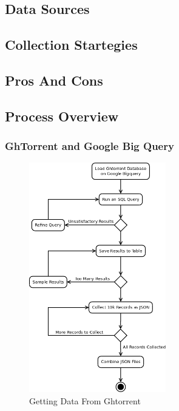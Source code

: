 \documentclass{article}
\begin{document}
\subsection{Data Sources}


\subsection{Collection Startegies}


\subsection{Pros And Cons}


\subsection{Process Overview}

\subsubsection{GhTorrent and Google Big Query}

\begin{figure}[!h]
    \centering
    \includegraphics[height=10cm]{diagrams/ght_process.png}
    \caption{Getting Data From Ghtorrent}
\end{figure}
\end{document}
